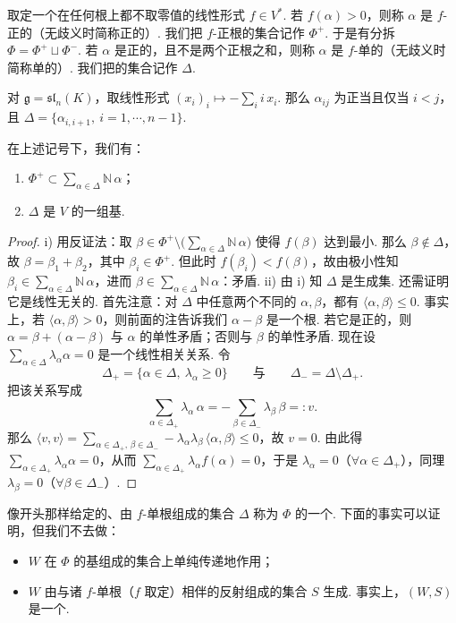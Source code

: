 \begin{numpara}[单根]\label{np:lie-2-6-4}
取定一个在任何根上都不取零值的线性形式 $f\in V^{*}$. 若 $f(\alpha)>0$，则称 $\alpha$ 是 $f$-正的（无歧义时简称正的）. 我们把 $f$-正根的集合记作 $\Phi^{+}$. 于是有分拆 $\Phi=\Phi^{+}\sqcup\Phi^{-}$. 若 $\alpha$ 是正的，且不是两个正根之和，则称 $\alpha$ 是 $f$-单的（无歧义时简称单的）. 我们把的集合记作 $\Delta$.
\begin{example*}
对 $\mathfrak g=\mathfrak{sl}_{n}(K)$，取线性形式 $(x_{i})_{i}\mapsto-\sum_{i}i\,x_{i}$. 那么 $\alpha_{ij}$ 为正当且仅当 $i<j$，且 $\Delta=\{\alpha_{i,i+1},\ i=1,\cdots,n-1\}$.
\end{example*}
\begin{theorem*}
在上述记号下，我们有：
\begin{enumerate}[label=\roman*)]
\item $\Phi^{+}\subset\sum_{\alpha\in\Delta}\mathbb N\,\alpha$；
\item $\Delta$ 是 $V$ 的一组基.
\end{enumerate}
\end{theorem*}
\begin{proof}
i) 用反证法：取 $\beta\in\Phi^{+}\setminus\bigl(\sum_{\alpha\in\Delta}\mathbb N\,\alpha\bigr)$ 使得 $f(\beta)$ 达到最小. 那么 $\beta\notin\Delta$，故 $\beta=\beta_{1}+\beta_{2}$，其中 $\beta_{i}\in\Phi^{+}$. 但此时 $f(\beta_{i})<f(\beta)$，故由极小性知 $\beta_{i}\in\sum_{\alpha\in\Delta}\mathbb N\,\alpha$，进而 $\beta\in\sum_{\alpha\in\Delta}\mathbb N\,\alpha$：矛盾.
ii) 由 i) 知 $\Delta$ 是生成集. 还需证明它是线性无关的. 首先注意：对 $\Delta$ 中任意两个不同的 $\alpha,\beta$，都有 $\langle\alpha,\beta\rangle\leqslant 0$. 事实上，若 $\langle\alpha,\beta\rangle>0$，则前面的注告诉我们 $\alpha-\beta$ 是一个根. 若它是正的，则 $\alpha=\beta+(\alpha-\beta)$ 与 $\alpha$ 的单性矛盾；否则与 $\beta$ 的单性矛盾.
现在设 $\sum_{\alpha\in\Delta}\lambda_{\alpha}\alpha=0$ 是一个线性相关关系. 令
\[
\Delta_{+}=\{\alpha\in\Delta,\ \lambda_{\alpha}\geqslant 0\}
\qquad\text{与}\qquad
\Delta_{-}=\Delta\setminus\Delta_{+}.
\]
把该关系写成
\[
\sum_{\alpha\in\Delta_{+}}\lambda_{\alpha}\,\alpha
=-\sum_{\beta\in\Delta_{-}}\lambda_{\beta}\,\beta=:v.
\]
那么 $\langle v,v\rangle=\sum_{\alpha\in\Delta_{+},\,\beta\in\Delta_{-}}-\lambda_{\alpha}\lambda_{\beta}\,\langle\alpha,\beta\rangle\leqslant 0$，故 $v=0$. 由此得 $\sum_{\alpha\in\Delta_{+}}\lambda_{\alpha}\alpha=0$，从而 $\sum_{\alpha\in\Delta_{+}}\lambda_{\alpha}f(\alpha)=0$，于是 $\lambda_{\alpha}=0$（$\forall\alpha\in\Delta_{+}$），同理 $\lambda_{\beta}=0$（$\forall\beta\in\Delta_{-}$）.
\end{proof}
像开头那样给定的、由 $f$-单根组成的集合 $\Delta$ 称为 $\Phi$ 的一个. 下面的事实可以证明，但我们不去做：
\begin{itemize}
\item $W$ 在 $\Phi$ 的基组成的集合上单纯传递地作用；
\item $W$ 由与诸 $f$-单根（$f$ 取定）相伴的反射组成的集合 $S$ 生成. 事实上，$(W,S)$ 是一个.
\end{itemize}
\end{numpara}

